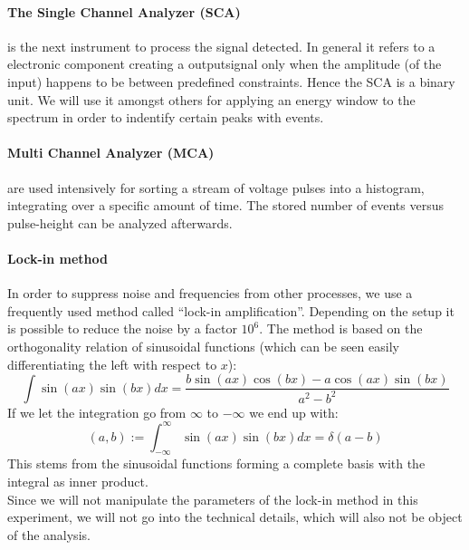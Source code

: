 \paragraph{The Single Channel Analyzer (SCA)} is the next instrument to process the signal detected. In general
it refers to a electronic component creating a outputsignal only when the amplitude (of the input) happens to be
between predefined constraints. Hence the SCA is a binary unit. We will use it amongst others for
applying an energy window to the spectrum in order to indentify certain peaks with events. 
\paragraph{Multi Channel Analyzer (MCA)} are used intensively for sorting a stream of voltage pulses
into a histogram, integrating over a specific amount of time. The stored number of events versus pulse-height
can be analyzed afterwards.
\paragraph{Lock-in method}
In order to suppress
noise and frequencies from other processes, we use
a frequently used method called ``lock-in amplification''. Depending on the
setup it is possible to reduce the noise by a factor $10^6$. The method
is based on the orthogonality relation of sinusoidal functions (which
    can be seen easily differentiating the left with respect to $x$):
\begin{equation}
    \int \sin(a x) \sin(b x) dx =\frac{ b \sin(a x) \cos(b x)-a \cos(a x)
        \sin(b x)}{a^2-b^2}
\end{equation}
If we let the integration go from $\infty$ to $-\infty$ we end up with:
\begin{equation}
    (a,b) := \int_{-\infty}^{\infty} \sin(a x) \sin(b x) dx = \delta(a - b)
\end{equation}
This stems from the sinusoidal functions forming a complete basis with
the integral as inner product.\\
Since we will not manipulate the parameters of the lock-in method in this
experiment, we will not go into the technical details, which
will also not be object of the analysis.


